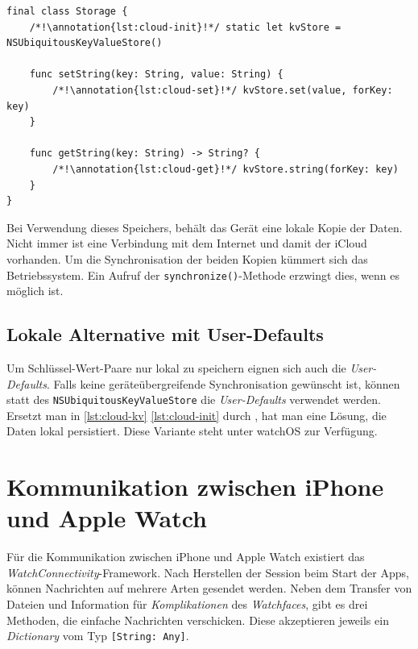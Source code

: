 \begin{lstlisting}[caption={Storage.swift},label={lst:cloud-kv}]
final class Storage {
    /*!\annotation{lst:cloud-init}!*/ static let kvStore = NSUbiquitousKeyValueStore()
    
    func setString(key: String, value: String) {
        /*!\annotation{lst:cloud-set}!*/ kvStore.set(value, forKey: key)
    }
    
    func getString(key: String) -> String? {
        /*!\annotation{lst:cloud-get}!*/ kvStore.string(forKey: key)
    }
}
\end{lstlisting}\setcounter{lstannotation}{0}

Bei Verwendung dieses Speichers, behält das Gerät eine lokale Kopie der Daten. Nicht immer ist eine Verbindung mit dem Internet und damit der iCloud vorhanden. Um die Synchronisation der beiden Kopien kümmert sich das Betriebssystem. Ein Aufruf der \texttt{synchronize()}-Methode erzwingt dies, wenn es möglich ist.

\subsection{Lokale Alternative mit User-Defaults}\label{sec:user-defaults}

Um Schlüssel-Wert-Paare nur lokal zu speichern eignen sich auch die \emph{User-Defaults}. Falls keine geräteübergreifende Synchronisation gewünscht ist, können statt des \texttt{NS\-Ubiq\-ui\-tous\-Key\-Value\-Store} die \emph{User-Defaults} verwendet werden. Ersetzt man in \autoref{lst:cloud-kv}  \ref*{lst:cloud-init} durch , hat man eine Lösung, die Daten lokal persistiert. Diese Variante steht unter watchOS zur Verfügung.

\section{Kommunikation zwischen iPhone und Apple Watch}\label{sec:watch-connectivity}

Für die Kommunikation zwischen iPhone und Apple Watch existiert das \emph{WatchConnectivity}-Framework. Nach Herstellen der Session beim Start der Apps, können Nachrichten auf mehrere Arten gesendet werden. Neben dem Transfer von Dateien und Information für \emph{Komplikationen} des \emph{Watchfaces}, gibt es drei Methoden, die einfache Nachrichten verschicken. Diese akzeptieren jeweils ein \emph{Dictionary} vom Typ \texttt{[String: Any]}.


